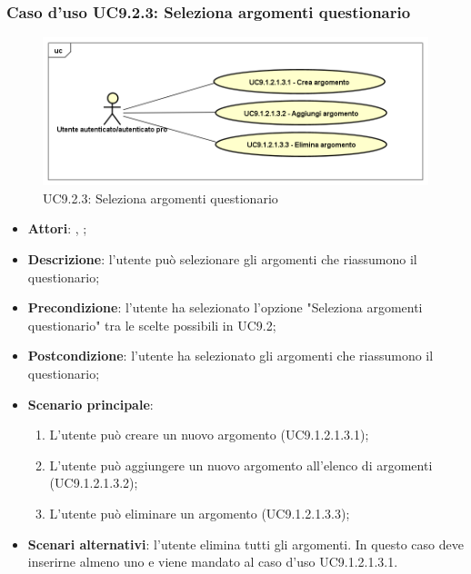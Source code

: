 		\subsubsection{Caso d'uso UC9.2.3: Seleziona argomenti questionario}
		\label{UC9.2.3}
		\begin{figure}[h]
			\centering
		\includegraphics[scale=0.5,keepaspectratio]{UML/UC9_2_3.png}
			\caption{UC9.2.3: Seleziona argomenti questionario}
		\end{figure}
		\FloatBarrier
		\begin{itemize}
			\item \textbf{Attori}: \uau, \uaupro;
			\item \textbf{Descrizione}: l'utente può selezionare gli argomenti che riassumono il questionario;
			\item \textbf{Precondizione}: l'utente ha selezionato l'opzione "Seleziona argomenti questionario" tra le scelte possibili in UC9.2; 
			\item \textbf{Postcondizione}: l'utente ha selezionato gli argomenti che riassumono il questionario; 
			\item \textbf{Scenario principale}:
			\begin{enumerate}
				\item L'utente può creare un nuovo argomento (UC9.1.2.1.3.1);
				\item L'utente può aggiungere un nuovo argomento all'elenco di argomenti (UC9.1.2.1.3.2);
				\item L'utente può eliminare un argomento (UC9.1.2.1.3.3);
			\end{enumerate}
			\item \textbf{Scenari alternativi}: l'utente elimina tutti gli argomenti. In questo caso deve inserirne almeno uno e viene mandato al caso d'uso UC9.1.2.1.3.1.
		\end{itemize}
							
